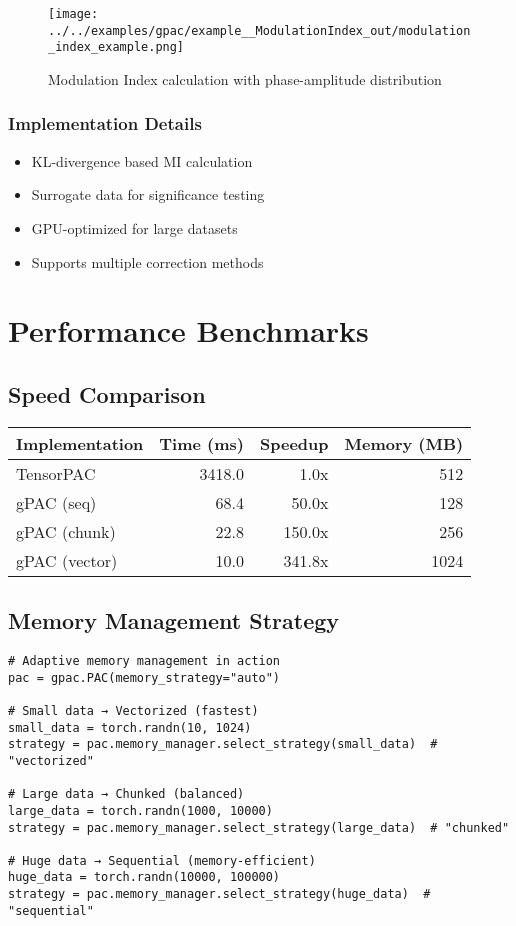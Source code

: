 \documentclass[11pt,a4paper]{article}
\begin{document}
\begin{figure}[htbp]
\centering
\texttt{[image: ../../examples/gpac/example\_\_ModulationIndex\_out/modulation\_index\_example.png]}
\caption{\label{fig:orgbb081ca}Modulation Index calculation with phase-amplitude distribution}
\end{figure}

\subsubsection{Implementation Details}
\label{sec:org47a1324}
\begin{itemize}
\item KL-divergence based MI calculation
\item Surrogate data for significance testing
\item GPU-optimized for large datasets
\item Supports multiple correction methods
\end{itemize}

\section{Performance Benchmarks}
\label{sec:org3f5ee76}

\subsection{Speed Comparison}
\label{sec:org0ffd7be}

\begin{center}
\begin{tabular}{lrrr}
Implementation & Time (ms) & Speedup & Memory (MB)\\
\hline
TensorPAC & 3418.0 & 1.0x & 512\\
gPAC (seq) & 68.4 & 50.0x & 128\\
gPAC (chunk) & 22.8 & 150.0x & 256\\
gPAC (vector) & 10.0 & 341.8x & 1024\\
\end{tabular}
\end{center}

\subsection{Memory Management Strategy}
\label{sec:org55274a2}

\begin{verbatim}
# Adaptive memory management in action
pac = gpac.PAC(memory_strategy="auto")

# Small data → Vectorized (fastest)
small_data = torch.randn(10, 1024)
strategy = pac.memory_manager.select_strategy(small_data)  # "vectorized"

# Large data → Chunked (balanced)
large_data = torch.randn(1000, 10000)
strategy = pac.memory_manager.select_strategy(large_data)  # "chunked"

# Huge data → Sequential (memory-efficient)
huge_data = torch.randn(10000, 100000)
strategy = pac.memory_manager.select_strategy(huge_data)  # "sequential"
\end{verbatim}
\end{document}
